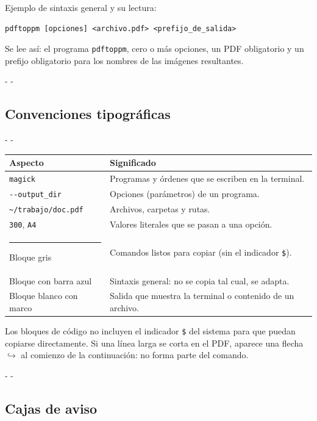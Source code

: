 \documentclass[11pt,a4paper]{article}
\makeatletter
\newcommand{\necesitaespacio}[1]{\par\penalty-100\begingroup
	\setlength{\dimen@}{#1}\dimen@ii\pagegoal\advance\dimen@ii-\pagetotal
	\ifdim\dimen@>\dimen@ii\ifdim\dimen@ii>\z@\vfil\fi\penalty-\@M\fi\endgroup}
\newcommand{\cmd}[1]{\texttt{\textcolor{colcmd}{#1}}}      %
\newcommand{\opt}[1]{\texttt{\textcolor{colopt}{#1}}}      %
\newcommand{\arch}[1]{\texttt{\textcolor{colarch}{#1}}}    %
\newcommand{\val}[1]{\texttt{#1}}                          %
\newcommand{\cab}[1]{\textbf{#1}}
\newcommand{\tl}{\textasciitilde{}}  %
\makeatother
\begin{document}
	Ejemplo de sintaxis general y su lectura:
	
	\begin{lstlisting}[style=sintaxis]
pdftoppm [opciones] <archivo.pdf> <prefijo_de_salida>
\end{lstlisting}
	
	Se lee así: el programa \cmd{pdftoppm}, cero o más opciones, un PDF obligatorio y un prefijo obligatorio para los nombres de las imágenes resultantes.
	
	\necesitaespacio{20\baselineskip}
	\subsection{Convenciones tipográficas}
	
	\begingroup\small
	\necesitaespacio{16\baselineskip}
	\begin{longtable}{L{4.3cm}L{10.76cm}}
		\toprule{}\cab{Aspecto} & \cab{Significado}\\\midrule
		\endfirsthead
		\bottomrule
		\endfoot
		\cmd{magick} & Programas y órdenes que se escriben en la terminal.\\*
		\opt{-{}-output\_dir} & Opciones (parámetros) de un programa.\\
		\arch{\tl/\allowbreak{}trabajo/\allowbreak{}doc.pdf} & Archivos, carpetas y rutas.\\
		\val{300}, \val{A4} & Valores literales que se pasan a una opción.\\
		\textcolor{codigofondo!50!black}{\rule{0.5cm}{0.25cm}} Bloque gris & Comandos listos para copiar (sin el indicador \texttt{\$}).\\
		Bloque con barra azul & Sintaxis general: no se copia tal cual, se adapta.\\*
		Bloque blanco con marco & Salida que muestra la terminal o contenido de un archivo.\\
	\end{longtable}
	\endgroup
	
	\begin{nota}
		Los bloques de código no incluyen el indicador \texttt{\$} del sistema para que puedan copiarse directamente. Si una línea larga se corta en el PDF, aparece una flecha \textcolor{codigocoment}{$\hookrightarrow$} al comienzo de la continuación: no forma parte del comando.
	\end{nota}
	
	\necesitaespacio{22\baselineskip}
	\subsection{Cajas de aviso}
	
\end{document}
